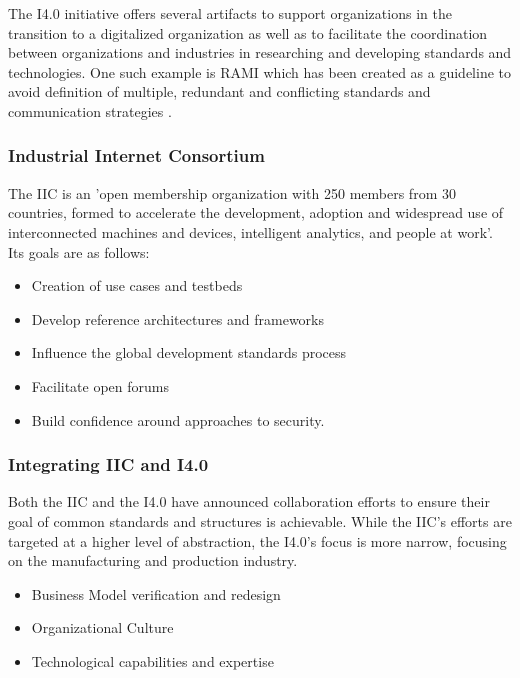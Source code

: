 The I4.0 initiative offers several artifacts to support organizations in the transition to a digitalized organization as well as to facilitate the coordination between organizations and industries in researching and developing standards and technologies. One such example is RAMI which has been created as a guideline to avoid definition of multiple, redundant and conflicting standards and communication strategies \cite[p. 41]{umsetzungsstrategie:2015}.

%

\subsubsection{Industrial Internet Consortium}
The IIC is an 'open membership organization with 250 members from 30 countries, formed to accelerate the development, adoption and widespread use of interconnected machines and devices, intelligent analytics, and people at work'\cite{iic-progress:2016}. Its goals are as follows:

\begin{itemize}
	\item  Creation of use cases and testbeds
\item  Develop reference architectures and frameworks
\item  Influence the global development standards process
\item  Facilitate open forums
\item  Build confidence around approaches to security.
\end{itemize}
\cite{iic-aboutus:2016}


\subsubsection{Integrating IIC and I4.0}

Both the IIC and the I4.0 have announced collaboration efforts to ensure their goal of common standards and structures is achievable. While the IIC's efforts are targeted at a higher level of abstraction, the I4.0's focus is more narrow, focusing on the manufacturing and production industry. 


\begin{itemize}
	\item Business Model verification and redesign \cite{gassmann2013geschaeftsmodelle}
	\item Organizational Culture
	\item Technological capabilities and expertise
\end{itemize}




